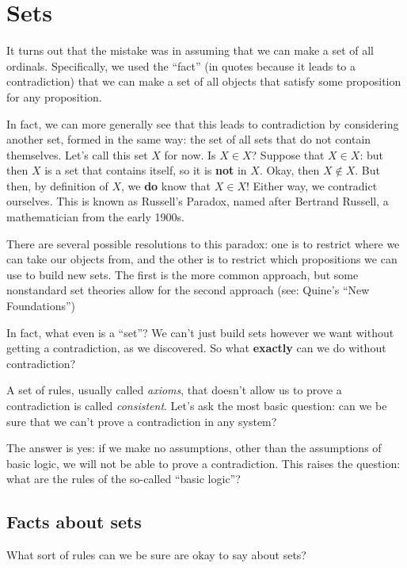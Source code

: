 \section{Sets}

It turns out that the mistake was in assuming that we can make a set of all ordinals.
Specifically, we used the ``fact'' (in quotes because it leads to a contradiction) that we can make a set of all objects that satisfy some proposition for any proposition.

In fact, we can more generally see that this leads to contradiction by considering another set, formed in the same way: the set of all sets that do not contain themselves.
Let's call this set $X$ for now.
Is $X \in X$?
Suppose that $X \in X$: but then $X$ is a set that contains itself, so it is \textbf{not} in $X$.
Okay, then $X \not\in X$.
But then, by definition of $X$, we \textbf{do} know that $X \in X$!
Either way, we contradict ourselves.
This is known as Russell's Paradox, named after Bertrand Russell, a mathematician from the early 1900s.

There are several possible resolutions to this paradox: one is to restrict where we can take our objects from, and the other is to restrict which propositions we can use to build new sets.
The first is the more common approach, but some nonstandard set theories allow for the second approach (see: Quine's ``New Foundations'')  

In fact, what even is a ``set''?
We can't just build sets however we want without getting a contradiction, as we discovered.
So what \textbf{exactly} can we do without contradiction?

A set of rules, usually called \emph{axioms}, that doesn't allow us to prove a contradiction is called \emph{consistent}.
Let's ask the most basic question: can we be sure that we can't prove a contradiction in any system?

The answer is yes: if we make no assumptions, other than the assumptions of basic logic, we will not be able to prove a contradiction.
This raises the question: what are the rules of the so-called ``basic logic''?

\subsection{Facts about sets}

What sort of rules can we be sure are okay to say about sets?

